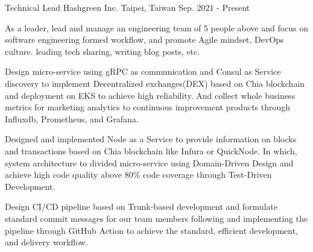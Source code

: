 

\begin{cventries}

\cventry
{Technical Lead} %
{Hashgreen Inc.} %
{Taipei, Taiwan} %
{Sep. 2021 - Present} %
{
  \begin{cvitems} %
    \item {As a leader, lead and manage an engineering team of 5 people above and focus on software engineering formed workflow, and promote Agile mindset, DevOps culture. leading tech sharing, writing blog posts, etc.}
    \item {Design micro-service using gRPC as communication and Consul as Service discovery to implement Decentralized exchanges(DEX) based on Chia blockchain and deployment on EKS to achieve high reliability. And collect whole business metrics for marketing analytics to continuous improvement products through Influxdb, Prometheus, and Grafana.}
    \item {Designed and implemented Node as a Service to provide information on blocks and transactions based on Chia blockchain like Infura or QuickNode. In which, system architecture to divided micro-service using Domain-Driven Design and achieve high code quality above 80\% code coverage through Test-Driven Development.}
    \item {Design CI/CD pipeline based on Trunk-based development and formulate standard commit messages for our team members following and implementing the pipeline through GitHub Action to achieve the standard, efficient development, and delivery workflow.}
  \end{cvitems}
}


\end{cventries}
